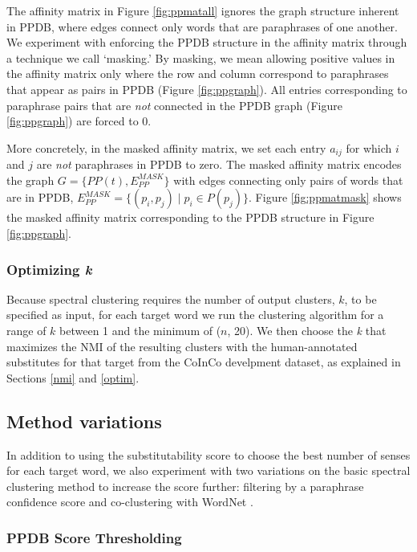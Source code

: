 \documentclass[11pt]{article}
\begin{document}
The affinity matrix in Figure \ref{fig:ppmatall} ignores the graph structure inherent in PPDB, where edges connect only words that are paraphrases of one another. We experiment with enforcing the PPDB structure in the affinity matrix through a technique we call `masking.' By masking, we mean allowing positive values in the affinity matrix only where the row and column correspond to paraphrases that appear as pairs in PPDB (Figure \ref{fig:ppgraph}). All entries corresponding to paraphrase pairs that are \textit{not} connected in the PPDB graph (Figure \ref{fig:ppgraph}) are forced to 0.

More concretely, in the masked affinity matrix, we set each entry $a_{ij}$ for which $i$ and $j$ are \textit{not} paraphrases in PPDB to zero. The masked affinity matrix encodes the graph $G = \{PP(t), E_{PP}^{MASK}\}$ with edges connecting only pairs of words that are in PPDB, $E_{PP}^{MASK} = \{(p_i, p_j) \mid p_i \in P(p_j)\}$. Figure \ref{fig:ppmatmask} shows the masked affinity matrix corresponding to the PPDB structure in Figure \ref{fig:ppgraph}.

\subsubsection{Optimizing \textit{k}}
\label{optimk}

Because spectral clustering requires the number of output clusters, $k$, to be specified as input, for each target word we run the clustering algorithm for a range of $k$ between 1 and the minimum of ($n$,  20). We then choose the \textit{k} that maximizes the NMI of the resulting clusters with the human-annotated substitutes for that target from the CoInCo develpment dataset, as explained in Sections \ref{nmi} and \ref{optim}.

\subsection{Method variations}

In addition to using the substitutability score to choose the best number of senses for each target word, we also experiment with 
two variations on the basic spectral clustering method to increase the score further: filtering by a paraphrase confidence score and co-clustering with WordNet \cite{fellbaum98wordnet}. 


\subsubsection{PPDB Score Thresholding}
\end{document}
